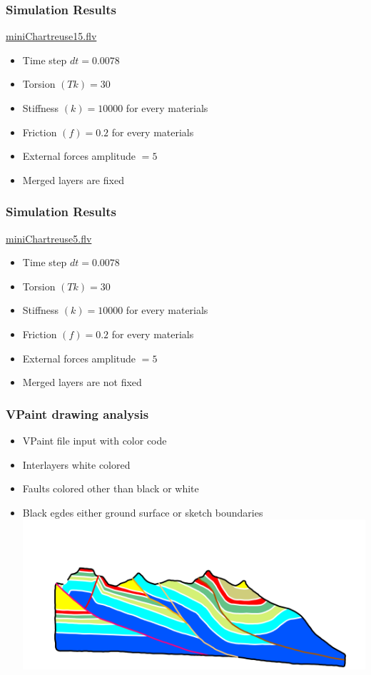 \documentclass{beamer}
\begin{document}
	\begin{frame}
	\frametitle{Simulation Results}
	\url{miniChartreuse15.flv}
	\begin{itemize}
	\item Time step $dt = 0.0078$
	\item Torsion $(Tk) = 30$
	\item Stiffness $(k) = 10000$ for every materials 
	\item Friction $(f) = 0.2$ for every materials 
	\item External forces amplitude $= 5 $
	\item Merged layers are fixed 
	\end{itemize}
	\end{frame}
	
	\begin{frame}
	\frametitle{Simulation Results}
	\url{miniChartreuse5.flv}
	\begin{itemize}
	\item Time step $dt = 0.0078$
	\item Torsion $(Tk) = 30$
	\item Stiffness $(k) = 10000$ for every materials 
	\item Friction $(f) = 0.2$ for every materials 
	\item External forces amplitude $= 5$ 
	\item Merged layers are not fixed 
	\end{itemize}
	\end{frame}
	
    \begin{frame}
    \frametitle{VPaint drawing analysis}
    \begin{itemize}
    \item VPaint file input with color code
    \item Interlayers white colored
    \item Faults colored other than black or white
    \item Black egdes either ground surface or sketch boundaries
    \includegraphics[scale=0.3]{chartreuse.png}
    \end{itemize}
    \end{frame}
\end{document}
